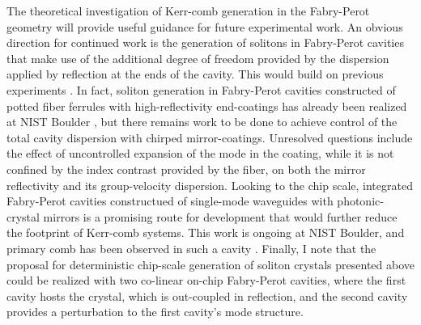 The theoretical investigation of Kerr-comb generation in the Fabry-Perot geometry will provide useful guidance for future experimental work. An obvious direction for continued work is the generation of solitons in Fabry-Perot cavities that make use of the additional degree of freedom provided by the dispersion applied by reflection at the ends of the cavity. This would build on previous experiments \cite{Braje2009,Obrzud2017}. In fact, soliton generation in Fabry-Perot cavities constructed of potted fiber ferrules with high-reflectivity end-coatings has already been realized at NIST Boulder \cite{Zhang2018}, but there remains work to be done to achieve control of the total cavity dispersion with chirped mirror-coatings. Unresolved questions include the effect of uncontrolled expansion of the mode in the coating, while it is not confined by the index contrast provided by the fiber, on both the mirror reflectivity and its group-velocity dispersion. Looking to the chip scale, integrated Fabry-Perot cavities constructued of single-mode waveguides with photonic-crystal mirrors is a promising route for development that would further reduce the footprint of Kerr-comb systems. This work is ongoing at NIST Boulder, and primary comb has been observed in such a cavity \cite{Yu2018}. Finally, I note that the proposal for deterministic chip-scale generation of soliton crystals presented above could be realized with two co-linear on-chip Fabry-Perot cavities, where the first cavity hosts the crystal, which is out-coupled in reflection, and the second cavity provides a perturbation to the first cavity's mode structure.







